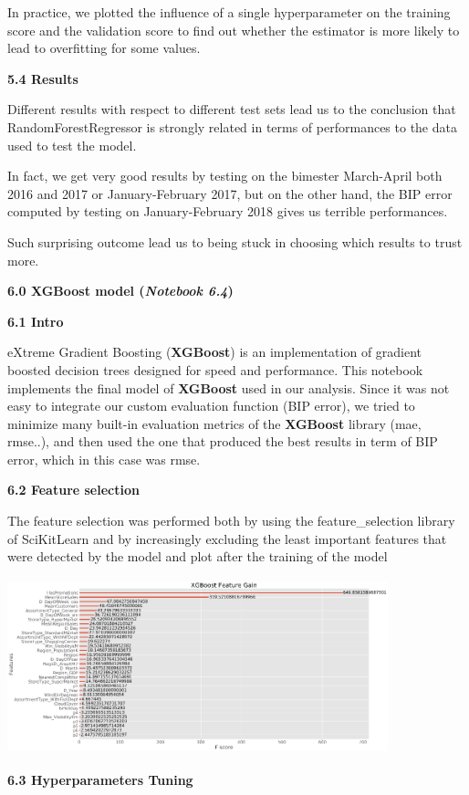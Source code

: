 \documentclass[]{article}
\begin{document}
In practice, we plotted the influence of a single hyperparameter on the
training score and the validation score to find out whether the
estimator is more likely to lead to overfitting for some values.

\textbf{5.4 Results}

Different results with respect to different test sets lead us to the
conclusion that RandomForestRegressor is strongly related in terms of
performances to the data used to test the model.

In fact, we get very good results by testing on the bimester March-April
both 2016 and 2017 or January-February 2017, but on the other hand, the
BIP error computed by testing on January-February 2018 gives us terrible
performances.

Such surprising outcome lead us to being stuck in choosing which results
to trust more.

\textbf{6.0 XGBoost model (\emph{Notebook 6.4})}

\textbf{6.1 Intro}

eXtreme Gradient Boosting (\textbf{XGBoost}) is an implementation of
gradient boosted decision trees designed for speed and performance. This
notebook implements the final model of \textbf{XGBoost} used in our
analysis. Since it was not easy to integrate our custom evaluation
function (BIP error), we tried to minimize many built-in evaluation
metrics of the \textbf{XGBoost} library (mae, rmse..), and then used the
one that produced the best results in term of BIP error, which in this
case was rmse.

\textbf{6.2 Feature selection}

The feature selection was performed both by using the feature\_selection
library of SciKitLearn and by increasingly excluding the least important
features that were detected by the model and plot after the training of
the model

\includegraphics[width=4.34479in,height=2.00322in]{media/image10.png}

\textbf{6.3 Hyperparameters Tuning}
\end{document}
